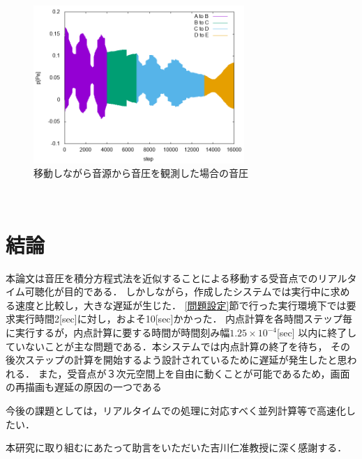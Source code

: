 \documentclass[dvipdfmx]{ampbt}
\begin{document}
\begin{figure}[H]
  \begin{center}
    \includegraphics[clip,width=8.0cm]{./png/kyoukai_all.png}
    \caption{移動しながら音源から音圧を観測した場合の音圧}
    \label{fig:kyoukai_all}
  \end{center}
\end{figure}\\




\section{結論}
本論文は音圧を積分方程式法を近似することによる移動する受音点でのリアルタイム可聴化が目的である．
しかしながら，作成したシステムでは実行中に求める速度と比較し，大きな遅延が生じた．
\ref{問題設定}節で行った実行環境下では要求実行時間2[sec]に対し，およそ10[sec]かかった．
内点計算を各時間ステップ毎に実行するが，内点計算に要する時間が時間刻み幅$1.25 \times 10^{-4}$[sec]
以内に終了していないことが主な問題である．本システムでは内点計算の終了を待ち，
その後次ステップの計算を開始するよう設計されているために遅延が発生したと思われる．
また，受音点が３次元空間上を自由に動くことが可能であるため，画面の再描画も遅延の原因の一つである\par
今後の課題としては，リアルタイムでの処理に対応すべく並列計算等で高速化したい．

\clearpage
\acknowledgment
本研究に取り組むにあたって助言をいただいた吉川仁准教授に深く感謝する．
\end{document}
